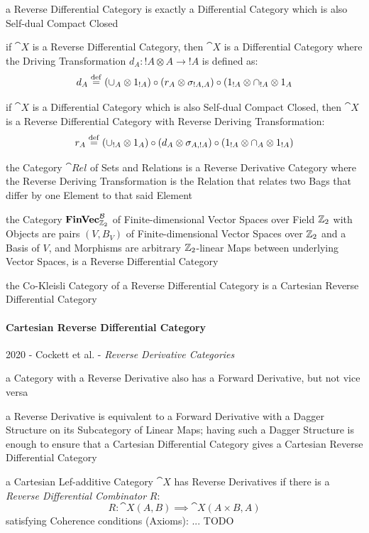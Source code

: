 a Reverse Differential Category is exactly a Differential Category which is also
Self-dual Compact Closed

if $\cat{X}$ is a Reverse Differential Category, then $\cat{X}$ is a
Differential Category where the Driving Transformation
$d_A : !A \otimes A \to !A$ is defined as:
\[
  d_A \stackrel{\mathrm{def}}= (\cup_A \otimes 1_{!A}) \circ (r_A \otimes \sigma_{!A,A})
    \circ (1_{!A} \otimes \cap_{!A} \otimes 1_A
\]


if $\cat{X}$ is a Differential Category which is also Self-dual Compact Closed,
then $\cat{X}$ is a Reverse Differential Category with Reverse Deriving
Transformation:
\[
  r_A \stackrel{\mathrm{def}}= (\cup_{!A} \otimes 1_A) \circ (d_A \otimes \sigma_{A,!A})
    \circ (1_{!A} \otimes \cap_A \otimes 1_{!A})
\]

the Category $\cat{Rel}$ of Sets and Relations is a Reverse Derivative Category
where the Reverse Deriving Transformation is the Relation that relates two Bags
that differ by one Element to that said Element

the Category $\mathbf{FinVec}_{\mathbb{Z}_2}^\mathcal{B}$ of Finite-dimensional Vector
Spaces over Field $\mathbb{Z}_2$ with Objects are pairs $(V, B_V)$ of
Finite-dimensional Vector Spaces over $\mathbb{Z}_2$ and a Basis of $V$, and
Morphisms are arbitrary $\mathbb{Z}_2$-linear Maps between underlying Vector Spaces,
is a Reverse Differential Category

the Co-Kleisli Category of a Reverse Differential Category is a Cartesian
Reverse Differential Category



\paragraph{Cartesian Reverse Differential Category}
\label{sec:cartesian_reverse_differential}\hfill

2020 - Cockett et al. - \emph{Reverse Derivative Categories}

a Category with a Reverse Derivative also has a Forward Derivative, but not vice
versa

a Reverse Derivative is equivalent to a Forward Derivative with a Dagger
Structure on its Subcategory of Linear Maps; having such a Dagger Structure is
enough to ensure that a Cartesian Differential Category gives a Cartesian
Reverse Differential Category

a Cartesian Lef-additive Category $\cat{X}$ has Reverse Derivatives if there is
a \emph{Reverse Differential Combinator} $R$:
\[
  R : \cat{X}(A,B) \implies \cat{X}(A \times B, A)
\]
satisfying Coherence conditions (Axioms): ... TODO

